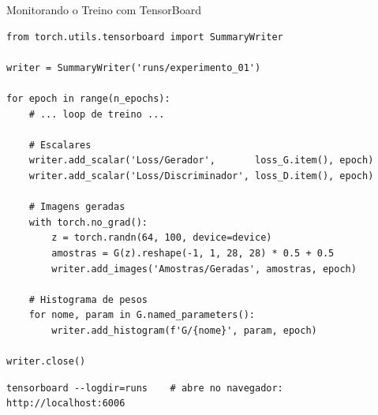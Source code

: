 \documentclass[aspectratio=169, 10pt]{beamer}
\begin{document}
\begin{frame}[fragile]{Monitorando o Treino com TensorBoard}
\begin{lstlisting}
from torch.utils.tensorboard import SummaryWriter

writer = SummaryWriter('runs/experimento_01')

for epoch in range(n_epochs):
    # ... loop de treino ...

    # Escalares
    writer.add_scalar('Loss/Gerador',       loss_G.item(), epoch)
    writer.add_scalar('Loss/Discriminador', loss_D.item(), epoch)

    # Imagens geradas
    with torch.no_grad():
        z = torch.randn(64, 100, device=device)
        amostras = G(z).reshape(-1, 1, 28, 28) * 0.5 + 0.5
        writer.add_images('Amostras/Geradas', amostras, epoch)

    # Histograma de pesos
    for nome, param in G.named_parameters():
        writer.add_histogram(f'G/{nome}', param, epoch)

writer.close()
\end{lstlisting}

\begin{lstlisting}[style=bash]
tensorboard --logdir=runs    # abre no navegador: http://localhost:6006
\end{lstlisting}
\end{frame}

\end{document}
